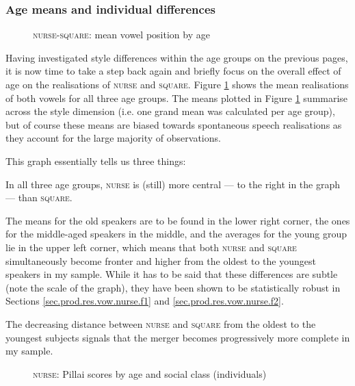 \subsubsection{Age means and individual differences}

\begin{figure}[h!]
	\centering
		
	\caption{\textsc{nurse}-\textsc{square}: mean vowel position by age}
	\label{fig.nurse.space.means}
\end{figure}

Having investigated style differences within the age groups on the previous pages, it is now time to take a step back again and briefly focus on the overall effect of age on the realisations of \textsc{nurse} and \textsc{square}.
Figure \ref{fig.nurse.space.means} shows the mean realisations of both vowels for all three age groups.
The means plotted in Figure \ref{fig.nurse.space.means} summarise across the style dimension (i.e. one grand mean was calculated per age group), but of course these means are biased towards spontaneous speech realisations as they account for the large majority of observations.

This graph essentially tells us three things:
\begin{inparaenum}[(1)]
	\item In all three age groups, \textsc{nurse} is (still) more central --- to the right in the graph --- than \textsc{square}.
	\item The means for the old speakers are to be found in the lower right corner, the ones for the middle-aged speakers in the middle, and the averages for the young group lie in the upper left corner, which means that both \textsc{nurse} and \textsc{square} simultaneously become fronter and higher from the oldest to the youngest speakers in my sample.
	While it has to be said that these differences are subtle (note the scale of the graph), they have been shown to be statistically robust in Sections \ref{sec.prod.res.vow.nurse.f1} and \ref{sec.prod.res.vow.nurse.f2}.
	\item The decreasing distance between \textsc{nurse} and \textsc{square}  from the oldest to the youngest subjects signals that the merger becomes progressively more complete in my sample.
\end{inparaenum}

\begin{figure}[h!]
	\centering
		
	\caption{\textsc{nurse}: Pillai scores by age and social class (individuals)}
	\label{fig.scatter.pillai.nurse}
\end{figure}

